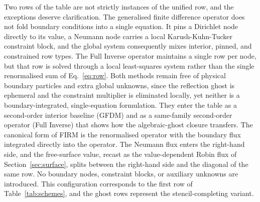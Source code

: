 \documentclass[preprint,review,12pt]{elsarticle}
\begin{document}
Two rows of the table are not strictly instances of the unified row, and the exceptions deserve clarification.
The generalised finite difference operator does not fold boundary conditions into a single equation.
It pins a Dirichlet node directly to its value, a Neumann node carries a local Karush-Kuhn-Tucker constraint block, and the global system consequently mixes interior, pinned, and constrained row types.
The Full Inverse operator maintains a single row per node, but that row is solved through a local least-squares system rather than the single renormalised sum of Eq.~\eqref{eq:row}.
Both methods remain free of physical boundary particles and extra global unknowns, since the reflection ghost is ephemeral and the constraint multiplier is eliminated locally, yet neither is a boundary-integrated, single-equation formulation.
They enter the table as a second-order interior baseline (GFDM) and as a same-family second-order operator (Full Inverse) that shows how the algebraic-ghost closure transfers.
The canonical form of FIRM is the renormalised operator with the boundary flux integrated directly into the operator.
The Neumann flux enters the right-hand side, and the free-surface value, recast as the value-dependent Robin flux of Section~\ref{sec:surface}, splits between the right-hand side and the diagonal of the same row.
No boundary nodes, constraint blocks, or auxiliary unknowns are introduced.
This configuration corresponds to the first row of Table~\ref{tab:schemes}, and the ghost rows represent the stencil-completing variant.
\end{document}
